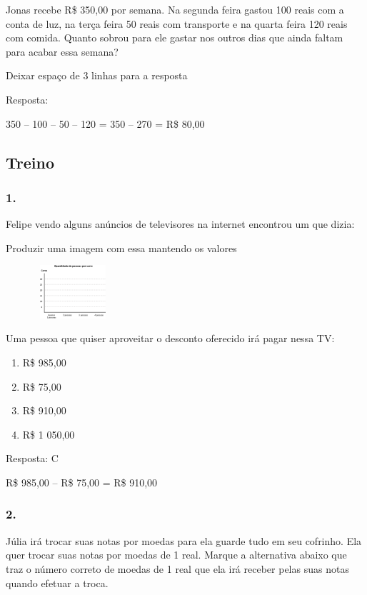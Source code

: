Jonas recebe R\$ 350,00 por semana. Na segunda feira gastou 100 reais
com a conta de luz, na terça feira 50 reais com transporte e na quarta
feira 120 reais com comida. Quanto sobrou para ele gastar nos outros
dias que ainda faltam para acabar essa semana?

Deixar espaço de 3 linhas para a resposta

Resposta:

350 -- 100 -- 50 -- 120 = 350 -- 270 = R\$ 80,00

\subsection{Treino}\label{treino-5}

\subsubsection{1.}\label{section-92}

Felipe vendo alguns anúncios de televisores na internet encontrou um que
dizia:

Produzir uma imagem com essa mantendo os valores

\includegraphics[width=1.95850in,height=0.77507in]{media/image81.png}

Uma pessoa que quiser aproveitar o desconto oferecido irá pagar nessa
TV:

\begin{enumerate}
\def\labelenumi{\alph{enumi})}
\item
  R\$ 985,00
\item
  R\$ 75,00
\item
  R\$ 910,00
\item
  R\$ 1 050,00
\end{enumerate}

Resposta: C

R\$ 985,00 -- R\$ 75,00 = R\$ 910,00

\subsubsection{2.}\label{section-93}

Júlia irá trocar suas notas por moedas para ela guarde tudo em seu
cofrinho. Ela quer trocar suas notas por moedas de 1 real. Marque a
alternativa abaixo que traz o número correto de moedas de 1 real que ela
irá receber pelas suas notas quando efetuar a troca.

